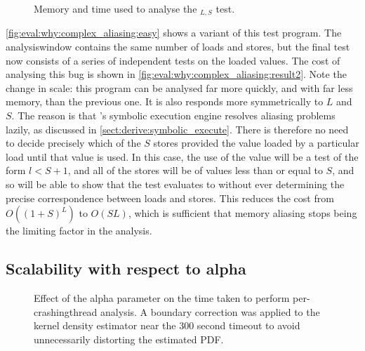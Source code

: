 \begin{figure}
  \caption{Memory and time used to analyse the
    $_{L,S}$ test.}
  \label{fig:eval:why:complex_aliasing:result2}
\end{figure}

\autoref{fig:eval:why:complex_aliasing:easy} shows a variant of this
test program.  The \gls{analysiswindow} contains the same number of
loads and stores, but the final test now consists of a series of
independent tests on the loaded values.  The cost of analysing this
bug is shown in \autoref{fig:eval:why:complex_aliasing:result2}.  Note
the change in scale: this program can be analysed far more quickly,
and with far less memory, than the previous one.  It is also responds
more symmetrically to $L$ and $S$.  The reason is that {\technique}'s
symbolic execution engine resolves aliasing problems lazily, as
discussed in \autoref{sect:derive:symbolic_execute}.  There is
therefore no need to decide precisely which of the $S$ stores provided
the value loaded by a particular load until that value is
used.  In this case, the use of the value will be a
test of the form $l < S+1$, and all of the stores will be of values
less than or equal to $S$, and so {\technique} will be able to show
that the test evaluates to \true without ever determining the precise
correspondence between loads and stores.  This reduces the cost from
$O((1+S)^L)$ to $O(SL)$, which is sufficient that memory aliasing
stops being the limiting factor in the analysis.


\subsection{Scalability with respect to \gls{alpha}}


\begin{figure}
  \caption{Effect of the \gls{alpha} parameter on the time taken to
    perform per-\gls{crashingthread} analysis.  A boundary correction
    was applied to the kernel density estimator near the 300 second
    timeout to avoid unnecessarily distorting the estimated PDF.}
  \label{fig:perf:alpha:bpm:unopt}
\end{figure}


